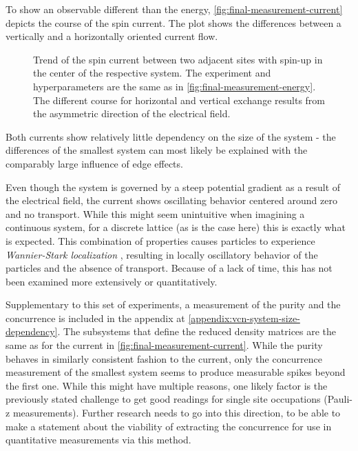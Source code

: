 To show an observable different than the energy, \autoref{fig:final-measurement-current} depicts the course of the spin current.
The plot shows the differences between a vertically and a horizontally oriented current flow.

\begin{figure}[htbp]
    \centering
    \vspace{-0.3cm}
    \caption{
            Trend of the spin current between two adjacent sites with spin-up in the center of the respective system.
            The experiment and hyperparameters are the same as in \autoref{fig:final-measurement-energy}.
            The different course for horizontal and vertical exchange results from the asymmetric direction of the electrical field.
        }
    \label{fig:final-measurement-current}
\end{figure}

Both currents show relatively little dependency on the size of the system - the differences of the smallest system can most likely be explained with the comparably large influence of edge effects.

Even though the system is governed by a steep potential gradient as a result of the electrical field, the current shows oscillating behavior centered around zero and no transport.
While this might seem unintuitive when imagining a continuous system, for a discrete lattice (as is the case here) this is exactly what is expected.
This combination of properties causes particles to experience \emph{Wannier-Stark localization} \cite{starkManyBodyLocalization}, %
resulting in locally oscillatory behavior of the particles and the absence of transport.
Because of a lack of time, this has not been examined more extensively or quantitatively.

Supplementary to this set of experiments, a measurement of the purity and the concurrence is included in the appendix at \ref{appendix:vcn-system-size-dependency}.
The subsystems that define the reduced density matrices are the same as for the current in \autoref{fig:final-measurement-current}.
While the purity behaves in similarly consistent fashion to the current, only the concurrence measurement of the smallest system seems to produce measurable spikes beyond the first one.
While this might have multiple reasons, one likely factor is the previously stated challenge to get good readings for single site occupations (Pauli-z measurements).
Further research needs to go into this direction, to be able to make a statement about the viability of extracting the concurrence for use in quantitative measurements via this method.